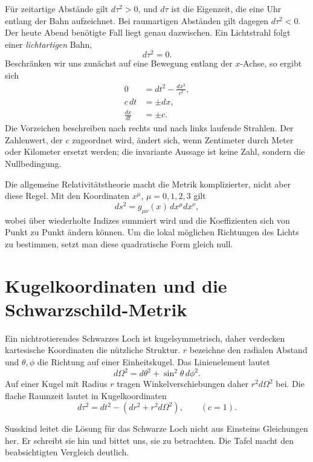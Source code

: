 Für zeitartige Abstände gilt \(d\tau^2>0\), und \(d\tau\) ist die Eigenzeit, die eine Uhr entlang der Bahn aufzeichnet. Bei raumartigen Abständen gilt dagegen \(d\tau^2<0\). Der heute Abend benötigte Fall liegt genau dazwischen. Ein Lichtstrahl folgt einer \emph{lichtartigen} Bahn,
\begin{equation}
d\tau^2=0.
\end{equation}
Beschränken wir uns zunächst auf eine Bewegung entlang der \(x\)-Achse, so ergibt sich
\begin{align}
0&=dt^2-\frac{dx^2}{c^2},\\
c\,dt&=\pm dx,\\
\frac{dx}{dt}&=\pm c.
\end{align}
Die Vorzeichen beschreiben nach rechts und nach links laufende Strahlen. Der Zahlenwert, der \(c\) zugeordnet wird, ändert sich, wenn Zentimeter durch Meter oder Kilometer ersetzt werden; die invariante Aussage ist keine Zahl, sondern die Nullbedingung.

Die allgemeine Relativitätstheorie macht die Metrik komplizierter, nicht aber diese Regel. Mit den Koordinaten \(x^\mu\), \(\mu=0,1,2,3\) gilt
\begin{equation}
ds^2=g_{\mu\nu}(x)\,dx^\mu dx^\nu,
\end{equation}
wobei über wiederholte Indizes summiert wird und die Koeffizienten sich von Punkt zu Punkt ändern können. Um die lokal möglichen Richtungen des Lichts zu bestimmen, setzt man diese quadratische Form gleich null.

\section{Kugelkoordinaten und die Schwarzschild-Metrik}

Ein nichtrotierendes Schwarzes Loch ist kugelsymmetrisch, daher verdecken kartesische Koordinaten die nützliche Struktur. \(r\) bezeichne den radialen Abstand und \(\theta,\phi\) die Richtung auf einer Einheitskugel. Das Linienelement lautet
\begin{equation}
d\Omega^2=d\theta^2+\sin^2\theta\,d\phi^2.
\end{equation}
Auf einer Kugel mit Radius \(r\) tragen Winkelverschiebungen daher \(r^2d\Omega^2\) bei. Die flache Raumzeit lautet in Kugelkoordinaten
\begin{equation}
d\tau^2=dt^2-\left(dr^2+r^2d\Omega^2\right),
\qquad (c=1).
\end{equation}

Susskind leitet die Lösung für das Schwarze Loch nicht aus Einsteins Gleichungen her. Er schreibt sie hin und bittet uns, sie zu betrachten. Die Tafel macht den beabsichtigten Vergleich deutlich.

